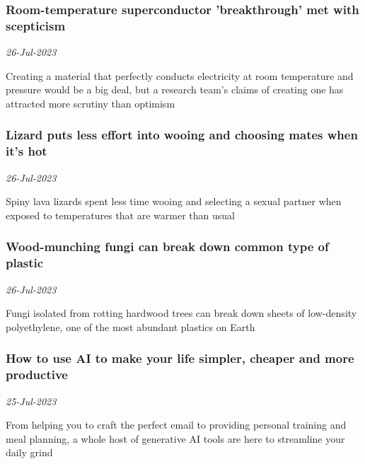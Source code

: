 \subsubsection{Room-temperature superconductor 'breakthrough' met with scepticism \href{https://www.newscientist.com/article/2384782-room-temperature-superconductor-breakthrough-met-with-scepticism/?utm_campaign=RSS%7CNSNS&utm_source=NSNS&utm_medium=RSS&utm_content=home}{}}
\textit{26-Jul-2023}

Creating a material that perfectly conducts electricity at room temperature and pressure would be a big deal, but a research team's claims of creating one has attracted more scrutiny than optimism
\subsubsection{Lizard puts less effort into wooing and choosing mates when it's hot \href{https://www.newscientist.com/article/2384434-lizard-puts-less-effort-into-wooing-and-choosing-mates-when-its-hot/?utm_campaign=RSS%7CNSNS&utm_source=NSNS&utm_medium=RSS&utm_content=home}{\ding{225}}}
\textit{26-Jul-2023}

Spiny lava lizards spent less time wooing and selecting a sexual partner when exposed to temperatures that are warmer than usual
\subsubsection{Wood-munching fungi can break down common type of plastic \href{https://www.newscientist.com/article/2384693-wood-munching-fungi-can-break-down-common-type-of-plastic/?utm_campaign=RSS%7CNSNS&utm_source=NSNS&utm_medium=RSS&utm_content=home}{}}
\textit{26-Jul-2023}

Fungi isolated from rotting hardwood trees can break down sheets of low-density polyethylene, one of the most abundant plastics on Earth
\subsubsection{How to use AI to make your life simpler, cheaper and more productive \href{https://www.newscientist.com/article/2384092-how-to-use-ai-to-make-your-life-simpler-cheaper-and-more-productive/?utm_campaign=RSS%7CNSNS&utm_source=NSNS&utm_medium=RSS&utm_content=home}{\ding{225}}}
\textit{25-Jul-2023}

From helping you to craft the perfect email to providing personal training and meal planning, a whole host of generative AI tools are here to streamline your daily grind
